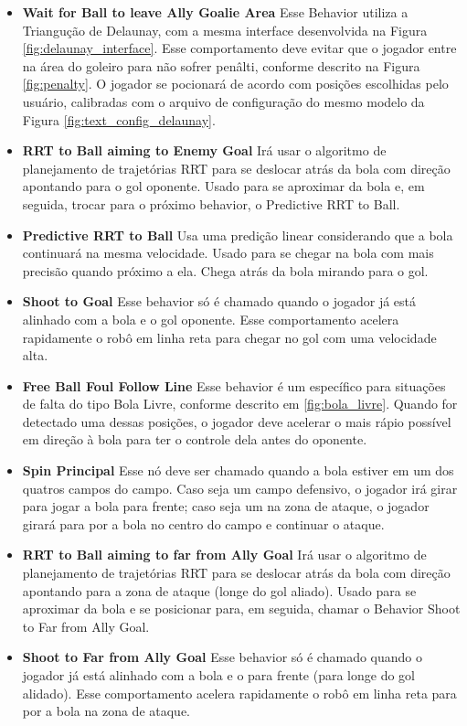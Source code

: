 \documentclass[10pt,fleqn,a4paper]{article}
\begin{document}
\begin{itemize}

\item \textbf{Wait for Ball to leave Ally Goalie Area} Esse Behavior utiliza a Triangução de Delaunay, com a mesma interface desenvolvida na Figura \ref{fig:delaunay_interface}. Esse comportamento deve evitar que o jogador entre na área do goleiro para não sofrer penâlti, conforme descrito na Figura \ref{fig:penalty}. O jogador se pocionará de acordo com posições escolhidas pelo usuário, calibradas com o arquivo de configuração do mesmo modelo da Figura \ref{fig:text_config_delaunay}.

\item \textbf{RRT to Ball aiming to Enemy Goal} Irá usar o algoritmo de planejamento de trajetórias RRT para se deslocar atrás da bola com direção apontando para o gol oponente. Usado para se aproximar da bola e, em seguida, trocar para o próximo behavior, o Predictive RRT to Ball.

\item \textbf{Predictive RRT to Ball} Usa uma predição linear considerando que a bola continuará na mesma velocidade. Usado para se chegar na bola com mais precisão quando próximo a ela. Chega atrás da bola mirando para o gol.

\item \textbf{Shoot to Goal} Esse behavior só é chamado quando o jogador já está alinhado com a bola e o gol oponente. Esse comportamento acelera rapidamente o robô em linha reta para chegar no gol com uma velocidade alta.

\item \textbf{Free Ball Foul Follow Line} Esse behavior é um específico para situações de falta do tipo Bola Livre, conforme descrito em \ref{fig:bola_livre}. Quando for detectado uma dessas posições, o jogador deve acelerar o mais rápio possível em direção à bola para ter o controle dela antes do oponente.

\item \textbf{Spin Principal} Esse nó deve ser chamado quando a bola estiver em um dos quatros campos do campo. Caso seja um campo defensivo, o jogador irá girar para jogar a bola para frente; caso seja um na zona de ataque, o jogador girará para por a bola no centro do campo e continuar o ataque.

\item \textbf{RRT to Ball aiming to far from Ally Goal} Irá usar o algoritmo de planejamento de trajetórias RRT para se deslocar atrás da bola com direção apontando para a zona de ataque (longe do gol aliado). Usado para se aproximar da bola e se posicionar para, em seguida, chamar o Behavior Shoot to Far from Ally Goal.

\item \textbf{Shoot to Far from Ally Goal} Esse behavior só é chamado quando o jogador já está alinhado com a bola e o para frente (para longe do gol alidado). Esse comportamento acelera rapidamente o robô em linha reta para por a bola na zona de ataque.

\end{itemize}
\end{document}
